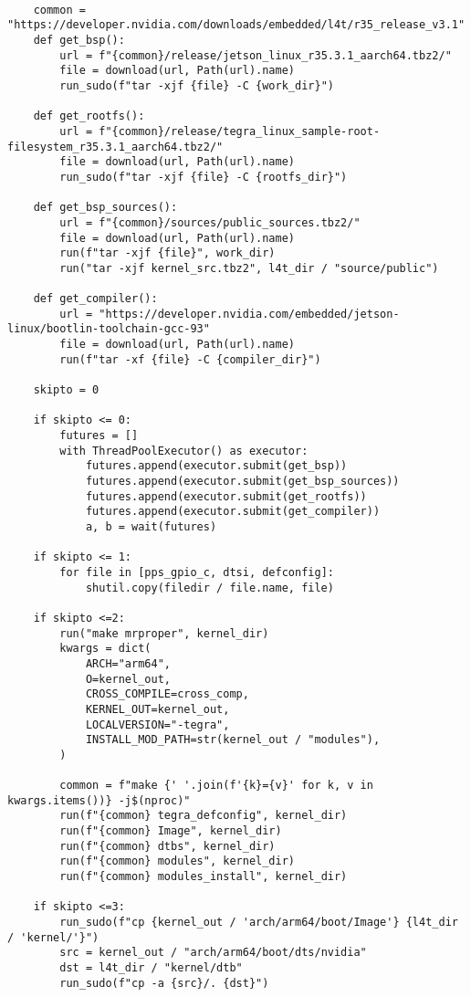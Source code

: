 \begin{verbatim}
    
    common = "https://developer.nvidia.com/downloads/embedded/l4t/r35_release_v3.1"
    def get_bsp():
        url = f"{common}/release/jetson_linux_r35.3.1_aarch64.tbz2/"
        file = download(url, Path(url).name)
        run_sudo(f"tar -xjf {file} -C {work_dir}")
    
    def get_rootfs():
        url = f"{common}/release/tegra_linux_sample-root-filesystem_r35.3.1_aarch64.tbz2/"
        file = download(url, Path(url).name)
        run_sudo(f"tar -xjf {file} -C {rootfs_dir}")
    
    def get_bsp_sources():
        url = f"{common}/sources/public_sources.tbz2/"
        file = download(url, Path(url).name)
        run(f"tar -xjf {file}", work_dir)
        run("tar -xjf kernel_src.tbz2", l4t_dir / "source/public")
    
    def get_compiler():
        url = "https://developer.nvidia.com/embedded/jetson-linux/bootlin-toolchain-gcc-93"
        file = download(url, Path(url).name)
        run(f"tar -xf {file} -C {compiler_dir}")

    skipto = 0
    
    if skipto <= 0:
        futures = []
        with ThreadPoolExecutor() as executor:
            futures.append(executor.submit(get_bsp))
            futures.append(executor.submit(get_bsp_sources))
            futures.append(executor.submit(get_rootfs))
            futures.append(executor.submit(get_compiler))
            a, b = wait(futures)

    if skipto <= 1:
        for file in [pps_gpio_c, dtsi, defconfig]:
            shutil.copy(filedir / file.name, file)

    if skipto <=2:
        run("make mrproper", kernel_dir)
        kwargs = dict(
            ARCH="arm64",
            O=kernel_out,
            CROSS_COMPILE=cross_comp,
            KERNEL_OUT=kernel_out,
            LOCALVERSION="-tegra",
            INSTALL_MOD_PATH=str(kernel_out / "modules"),
        )
    
        common = f"make {' '.join(f'{k}={v}' for k, v in kwargs.items())} -j$(nproc)"
        run(f"{common} tegra_defconfig", kernel_dir)
        run(f"{common} Image", kernel_dir)
        run(f"{common} dtbs", kernel_dir)
        run(f"{common} modules", kernel_dir)
        run(f"{common} modules_install", kernel_dir)

    if skipto <=3:
        run_sudo(f"cp {kernel_out / 'arch/arm64/boot/Image'} {l4t_dir / 'kernel/'}")
        src = kernel_out / "arch/arm64/boot/dts/nvidia"
        dst = l4t_dir / "kernel/dtb"
        run_sudo(f"cp -a {src}/. {dst}")
    

\end{verbatim}
